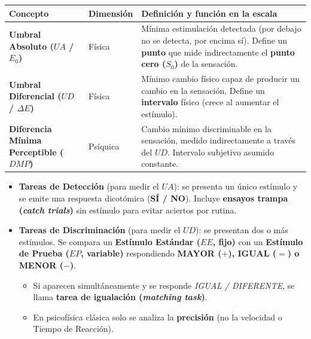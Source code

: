 \documentclass[11pt,a4paper]{article}
\begin{document}
\vspace{0.3em}
\begin{center}
\renewcommand{\arraystretch}{1.35}
\begin{tabularx}{\textwidth}{@{}>{\raggedright\arraybackslash}p{4.0cm}>{\centering\arraybackslash}p{2.1cm}>{\raggedright\arraybackslash}X@{}}
\toprule
\rowcolor{Primary!15}
\textbf{Concepto} & \textbf{Dimensión} & \textbf{Definición y función en la escala} \\
\midrule
\textbf{Umbral Absoluto ($UA$ / $E_0$)} & Física & Mínima estimulación detectada (por debajo no se detecta, por encima sí). Define un \textbf{punto} que mide indirectamente el \textbf{punto cero ($S_0$)} de la sensación. \\
\textbf{Umbral Diferencial ($UD$ / $\Delta E$)} & Física & Mínimo cambio físico capaz de producir un cambio en la sensación. Define un \textbf{intervalo} físico (crece al aumentar el estímulo). \\
\textbf{Diferencia Mínima Perceptible ($DMP$)} & Psíquica & Cambio mínimo discriminable en la sensación, medido indirectamente a través del $UD$. Intervalo subjetivo asumido constante. \\
\bottomrule
\end{tabularx}
\end{center}
\vspace{0.3em}

\begin{itemize}
  \item \textbf{Tareas de Detección} (para medir el \textbf{$UA$}): se presenta un único estímulo y se emite una respuesta dicotómica (\textbf{SÍ / NO}). Incluye \textbf{ensayos trampa (\textit{catch trials})} sin estímulo para evitar aciertos por rutina.
  \item \textbf{Tareas de Discriminación} (para medir el \textbf{$UD$}): se presentan dos o más estímulos. Se compara un \textbf{Estímulo Estándar ($EE$, fijo)} con un \textbf{Estímulo de Prueba ($EP$, variable)} respondiendo \textbf{MAYOR ($+$), IGUAL ($=$) o MENOR ($-$)}.
  \begin{itemize}
    \item Si aparecen simultáneamente y se responde \textit{IGUAL / DIFERENTE}, se llama \textbf{tarea de igualación (\textit{matching task})}.
    \item En psicofísica clásica solo se analiza la \textbf{precisión} (no la velocidad o Tiempo de Reacción).
  \end{itemize}
\end{itemize}
\end{document}
